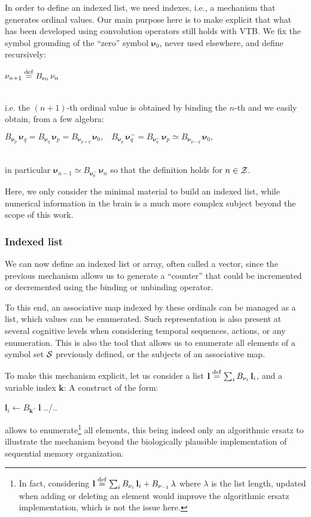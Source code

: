 \documentclass[sn-mathphys]{sn-jnl}
\newcommand{\defq}{\stackrel {\rm def}{=}}
\newcommand{\eqline}[1]{~\vspace{0.1cm}\\\centerline{$#1$}\vspace{0.1cm}\\}
\begin{document}
\begin{appendices}
In order to define an indexed list, we need indexes, i.e., a mechanism that generates ordinal values. Our main purpose here is to make explicit that what has been developed using convolution operators \cite{komer_neural_2019} still holds with VTB. We fix the symbol grounding of the ``zero'' symbol $\mathbf{\nu}_0$, never used elsewhere, and define recursively:
\eqline{\mathbf{\nu}_{n + 1} \defq B_{\mathbf{\nu}_0} \, \mathbf{\nu}_n}
i.e. the $(n+1)$-th ordinal value is obtained by binding the $n$-th and we easily obtain, from a few algebra:
\eqline{B_{\mathbf{\nu}_p} \, \mathbf{\nu}_q = B_{\mathbf{\nu}_q} \, \mathbf{\nu}_p = B_{\mathbf{\nu}_{p+q}} \, \mathbf{\nu}_0, \;\;\; 
B_{\mathbf{\nu}_p} \, \mathbf{\nu}_q^\sim = B_{\mathbf{\nu}_q^\sim} \, \mathbf{\nu}_p  \simeq B_{\mathbf{\nu}_{p-q}} \, \mathbf{\nu}_0,}
in particular $\mathbf{\nu}_{n - 1} \simeq B_{\mathbf{\nu}_0^\sim} \, \mathbf{\nu}_n$ so that the definition
holds for $n \in {\cal Z}$.

Here, we only consider the minimal material to build an indexed list, while numerical information in the brain is a much more complex subject \cite{nieder_representation_2007} beyond the scope of this work.

\subsubsection{Indexed list} 
We can now define an indexed list or array, often called a vector, since the previous mechanism allows us to generate a ``counter'' that could be incremented or decremented using the binding or unbinding operator.

To this end, an associative map indexed by these ordinals can be managed as a list, which values can be enumerated. Such representation is also present at several cognitive levels when considering temporal sequences, actions, or any enumeration. This is also the tool that allows us to enumerate all elements of a symbol set ${\cal S}$ previously defined, or the subjects of an associative map.

To make this mechanism explicit, let us consider a list $\mathbf{l} \defq \sum_i B_{\mathbf{\nu}_i} \, \mathbf{l}_i$, and a variable index $\mathbf{k}$: A construct of the form:
\begin{algorithmic}
   \State $\mathbf{l}_i \leftarrow B_{\mathbf{k}^\sim} \, \mathbf{l}$
\State ../..
\EndFor
\end{algorithmic}
allows to enumerate\footnote{In fact, considering $\mathbf{l} \defq \sum_i B_{\mathbf{\nu}_i} \, \mathbf{l}_i + B_{\mathbf{\nu}_{-1}} \, \lambda$ where $\lambda$ is the list length, updated when adding or deleting an element would improve the algorithmic ersatz implementation, which is not the issue here.} all elements, this being indeed only an algorithmic ersatz to illustrate the mechanism beyond the biologically plausible implementation of sequential memory organization.


\end{appendices}
\end{document}

